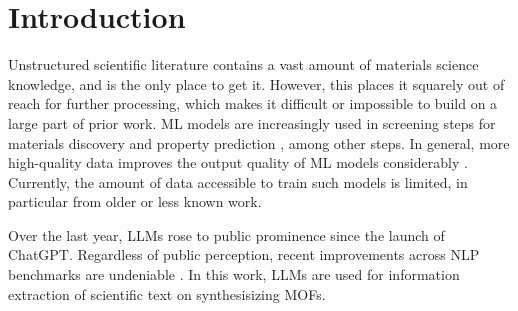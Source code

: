 \chapter{Introduction}\label{chap:introduction}

Unstructured scientific literature contains a vast amount of materials science knowledge, and is the only place to get it.
However, this places it squarely out of reach for further processing, which makes it difficult or impossible to build on a large part of prior work.
\gls{ML} models are increasingly used in screening steps for materials discovery and property prediction \cite{saal_machine_2020, luo_mof_2022, choudhary_recent_2022}, among other steps.
In general, more high-quality data improves the output quality of \gls{ML} models considerably \cite{hoffmann_empirical_2022}.
Currently, the amount of data accessible to train such models is limited,  in particular from older or less known work.

Over the last year, \glspl{LLM} rose to public prominence since the launch of \gls{ChatGPT}.
Regardless of public perception, recent improvements across \gls{NLP} benchmarks are undeniable \cite{devlin_bert_2018, openai_gpt4_2023}.
In this work, \glspl{LLM} are used for information extraction of scientific text on synthesisizing \glspl{MOF}.





